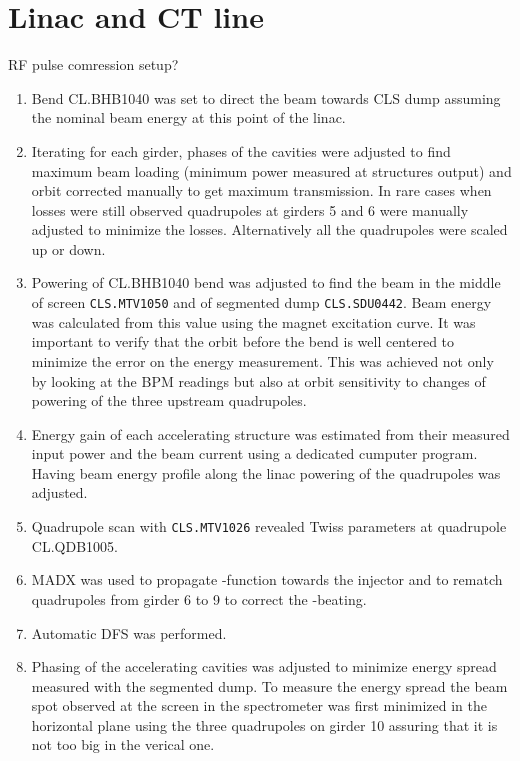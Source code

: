 \section{Linac and CT line}

RF pulse comression setup?


\begin{enumerate}

\item
Bend CL.BHB1040 was set to direct the beam towards CLS dump
assuming the nominal beam energy at this point of the linac.
\item
Iterating for each girder, phases of the cavities were adjusted to find maximum beam loading
(minimum power measured at structures output)
and orbit corrected manually to get maximum transmission.
In rare cases when losses were still observed 
quadrupoles at girders 5 and 6 were manually adjusted to minimize the losses.
Alternatively all the quadrupoles were scaled up or down.
\item
Powering of CL.BHB1040 bend was adjusted to find the beam in the middle 
of screen \texttt{CLS.MTV1050} and of segmented dump \texttt{CLS.SDU0442}.
Beam energy was calculated from this value using the magnet excitation curve.
It was important to verify that the orbit before the bend is well centered
to minimize the error on the energy measurement. This was achieved not only by 
looking at the BPM readings but also at orbit sensitivity to changes
of powering of the three upstream quadrupoles.
\item
Energy gain of each accelerating structure was estimated from their measured input power
and the beam current using a dedicated cumputer program.
Having beam energy profile along the linac powering of the quadrupoles was adjusted.
\item
Quadrupole scan with \texttt{CLS.MTV1026} revealed Twiss parameters at quadrupole CL.QDB1005.
\item
MADX was used to propagate \textbeta-function towards the injector and
to rematch quadrupoles from girder 6 to 9 to correct the \textbeta-beating.
\item
Automatic \ac{DFS} was performed.
\item
Phasing of the accelerating cavities was adjusted to minimize energy spread
measured with the segmented dump. 
To measure the energy spread the beam spot observed at the screen in the spectrometer was 
first minimized in the horizontal plane using the three quadrupoles on girder 10 
assuring that it is not too big in the verical one.

\end{enumerate}
